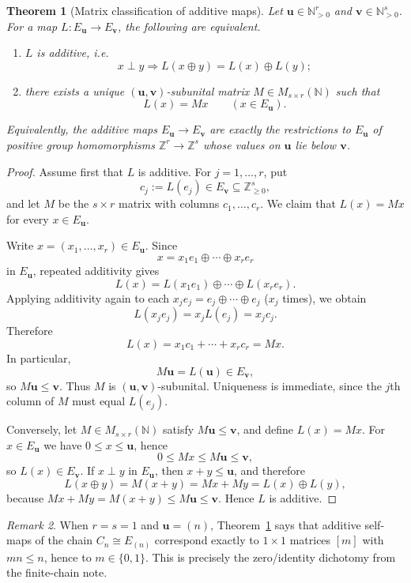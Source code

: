 \documentclass[11pt]{article}
\newtheorem{theorem}{Theorem}[section]
\theoremstyle{definition}
\theoremstyle{remark}
\newtheorem{remark}[theorem]{Remark}
\numberwithin{equation}{section}
\newcommand{\op}{\oplus}
\newcommand{\perpdef}{\mathrel{\perp}}
\newcommand{\NN}{\mathbb{N}}
\newcommand{\ZZ}{\mathbb{Z}}
\begin{document}
\begin{theorem}[Matrix classification of additive maps]\label{thm:additive-maps-matrix}
Let $\mathbf u\in\NN_{>0}^r$ and $\mathbf v\in\NN_{>0}^s$. For a map $L\colon E_{\mathbf u}\to E_{\mathbf v}$, the following are equivalent.
\begin{enumerate}[label=\textup{(\roman*)},leftmargin=2.7em]
    \item $L$ is additive, i.e.
    \[
    x\perpdef y \Longrightarrow L(x\op y)=L(x)\op L(y);
    \]
    \item there exists a unique $(\mathbf u,\mathbf v)$-subunital matrix $M\in M_{s\times r}(\NN)$ such that
    \[
    L(x)=Mx
    \qquad (x\in E_{\mathbf u}).
    \]
\end{enumerate}
Equivalently, the additive maps $E_{\mathbf u}\to E_{\mathbf v}$ are exactly the restrictions to $E_{\mathbf u}$ of positive group homomorphisms $\ZZ^r\to\ZZ^s$ whose values on $\mathbf u$ lie below $\mathbf v$.
\end{theorem}

\begin{proof}
Assume first that $L$ is additive. For $j=1,\dots,r$, put
\[
c_j:=L(e_j)\in E_{\mathbf v}\subseteq \ZZ_{\ge 0}^s,
\]
and let $M$ be the $s\times r$ matrix with columns $c_1,\dots,c_r$. We claim that $L(x)=Mx$ for every $x\in E_{\mathbf u}$.

Write $x=(x_1,\dots,x_r)\in E_{\mathbf u}$. Since
\[
x=x_1e_1\op\cdots\op x_re_r
\]
in $E_{\mathbf u}$, repeated additivity gives
\[
L(x)=L(x_1e_1)\op\cdots\op L(x_re_r).
\]
Applying additivity again to each $x_je_j=e_j\op\cdots\op e_j$ ($x_j$ times), we obtain
\[
L(x_j e_j)=x_j L(e_j)=x_j c_j.
\]
Therefore
\[
L(x)=x_1c_1+\cdots+x_rc_r=Mx.
\]
In particular,
\[
M\mathbf u=L(\mathbf u)\in E_{\mathbf v},
\]
so $M\mathbf u\le \mathbf v$. Thus $M$ is $(\mathbf u,\mathbf v)$-subunital. Uniqueness is immediate, since the $j$th column of $M$ must equal $L(e_j)$.

Conversely, let $M\in M_{s\times r}(\NN)$ satisfy $M\mathbf u\le \mathbf v$, and define $L(x)=Mx$. For $x\in E_{\mathbf u}$ we have $0\le x\le \mathbf u$, hence
\[
0\le Mx\le M\mathbf u\le \mathbf v,
\]
so $L(x)\in E_{\mathbf v}$. If $x\perpdef y$ in $E_{\mathbf u}$, then $x+y\le \mathbf u$, and therefore
\[
L(x\op y)=M(x+y)=Mx+My=L(x)\op L(y),
\]
because $Mx+My=M(x+y)\le M\mathbf u\le \mathbf v$. Hence $L$ is additive.
\end{proof}

\begin{remark}\label{rem:rank-one-special}
When $r=s=1$ and $\mathbf u=(n)$, Theorem~\ref{thm:additive-maps-matrix} says that additive self-maps of the chain $C_n\cong E_{(n)}$ correspond exactly to $1\times 1$ matrices $[m]$ with $mn\le n$, hence to $m\in\{0,1\}$. This is precisely the zero/identity dichotomy from the finite-chain note.
\end{remark}
\end{document}

